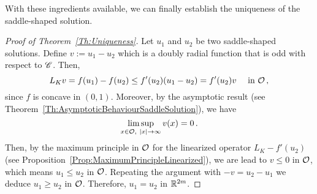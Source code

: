 With these ingredients available, we can finally establish the uniqueness of the saddle-shaped solution.



\begin{proof}[Proof of Theorem~\ref{Th:Uniqueness}]
	Let $u_1$ and $u_2$ be two saddle-shaped solutions. Define $v := u_1 - u_2$ which is a doubly radial function that is odd with respect to $\mathscr{C}$. Then,
	$$
	L_K v = f(u_1) - f(u_2) \leq f'(u_2) (u_1 - u_2) = f'(u_2) v \quad \textrm{ in } \mathcal{O}\,,
	$$
	since $f$ is concave in $(0,1)$. Moreover, by the asymptotic result (see Theorem~\ref{Th:AsymptoticBehaviourSaddleSolution}), we have
	$$
	\limsup_{x\in \mathcal{O}, \ |x|\to \infty} v(x) = 0\,.
	$$
	Then, by the maximum principle in $\mathcal{O}$ for the linearized operator $L_K  - f'(u_2)$ (see Proposition~\ref{Prop:MaximumPrincipleLinearized}), we are lead to $v \leq 0$ in $\mathcal{O}$, which means $u_1 \leq u_2$ in $\mathcal{O}$. Repeating the  argument with $-v = u_2 - u_1$ we deduce $u_1 \geq u_2$ in $\mathcal{O}$. Therefore, $u_1 = u_2$ in $\mathbb{R}^{2m}$.
\end{proof}


